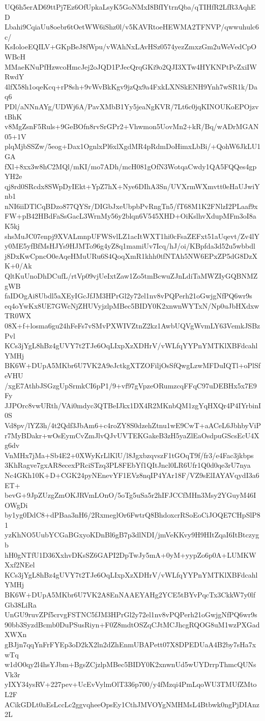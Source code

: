 UQ6h5erAD69ttPj7Ez6OfUpkaLsyK5GoNMxI8BfIYtrnQba/qTIHfR2LfR3AqhED
Lbahi9CqiaUu8oebr6tOetWW6iShz0l/v5KAVRtoeHEWMA2TFNVP/qwwuhulc6c/
KsIoloeEQILV+GKpBeJ8fWpu/vWAhNxLAvHSz0574yezZmxzGm2uWeVedCpOWBcH
MMaeKNuPfHzwcoHmcJej2oJQD1PJecQrqGKi9o2QJI3XTw4HYKNPtPeZxiIWRwdY
4lfX58h1oqeKcq+rP8sh+9vWvBkKgv9jzQx9a4FxkLXNSkENH9Ynh7wSR1k/Daq6
PDl/aNNnAYg/UDWj6A/PavXMbB1Yy5jeaNgKVR/7Lt6c0jqKINOUKoEPOjzvtBhK
v8MgZsnF5Ruls+9GeBOfn8rvSrGPr2+Vhwmon5UovMn2+kR/Bq/wADrMGAN05+1V
plqMjbSSZw/5eog+Dax1OgnlxPl6xlXgdMR4pRdmDoHimxLbBi/+QohW6JkLU1GA
fXl+8xx3w8hC2MQl/mKI/mo7ADh/mcH081gOfN3WotqaCwdy1QA5FQQes4gpYH2e
qj8rd0SRcdx8SWpDyIEkt+YpZ7hX+Nye6DIhA3Sn/UVXrmWXmvtt0eHaUJwiYnb1
nNI6iiDTlCqBDzo877QYSr/DIGbJxeUbpbPvRngTn5/fT68M1K2FNlzI2PLaaf9x
FW+pB42HBdFaSsGacL3WrnMy56y2blqn6V545XHD+OiKslhvXdupMFm3oI8aK5kj
shsMuJC07enpj9XVALmnpUFWSvlLZ1acItWXT1hi0cFsaZEFxt51aUqevt/Zv4lY
y0ME5yfBfMsHJYs9HJMTo96g4yZ8q1mamiUv7Icq/hJ/oi/KBpfda3d52u5wbbdl
j8DxKwCpncO0eAqeHMuURu6S4QoqXmR1khh0tfNTAh5NW6EPxZP5dG8DzXK+0/Ak
QltKuUnoDhDCufL/rtVp09vjUeIxtZaw1Zo5tmBcwuZJnLdiTaMWZIyGQBNMZgWB
faIDOgAi8Ubdl5aXEyIGcJfJM3HPrGl2y72el1nv8vPQPerh21oGwjgNfPQ6wr9s
eq4oYwKx8UE7GWcNjZHUVyjzlpMBec5BIDY0K2xnwnWYTxN/Np0uJbHXdxwTR0WX
08X+f+losma6gu24hFeFs7vSMvPXWIVZtnZ2kz1AwbUQVgWvmLY63VemkJSBzPvl
KCs3jYgL8hBz4gUVY7t2TJe6OqLIxpXzXDHrV/vWLfqYYPnYMTKlXBFdcahlYMHj
BK6W+DUpA5MKbr6U7VK2A9eJctkgXTZOFiljOsSfQwgLzwMFDuIQTl+oPlSfeVHU
/xgE7AthbJSGzgUpSrmkCI6pP1/9+vf97gVpzeORumzcqFFqC97uDEBHx5x7E9Fy
JJPOrc8vwURth/VAi0mdyc3QTBeIJkx1DX4R2MKnbQM1zgYqHXQr4P4IYrbinI0S
Vd8pv/lYZ3h/4t2Qdf3JbAm6+c4roZY8S0dzehZtnu1wE9CwT+aACeL6JbhbyViP
r7MyBDakr+wOsEymCvZmJlvQJvUVTEKGakeB3zH5yaZlEaOsdpuGScsEcU4Xg6dv
VnMHx7jMa+Sb4E2+0XWyKrLlKlU/l8JgxbzqvszF1tGOqT9f/fr3/e4Fac3jkbps
3KhRagve7gxAR8ecexPRciSTzq3PL8FEbYf1QItJncl0LR6Ufr1Q0d0qe3rU7nya
Nc4GKh10K+D+CGK24pyNEnevYF1EVz8nqIP4YAr18F/VZ9sElIAYAVqydI3a6ET+
bevG+9JpZUzgZmOKJRVmLOnO/5oTg5uSa5r2hIFJCCfMHn3Msy2YGuyM46IOWgDi
by1yg0DdC8+dPBaa3nH6/2RxmeglOr6FwtrQ8BhdoxcrRSoEoCiJOQE7CHpSlP81
yzKhNO5UubYCGaBGxyoKDnBl6gB7p3dlNDI/jmVeKKvy9H9HItZqaI6ItBtczygb
hH0gNTfU1D36XxhvDKsSZ6GAPI2DpTwJy5mA+0yM+yypZo6p0A+LUMKWXxf2NEel
KCs3jYgL8hBz4gUVY7t2TJe6OqLIxpXzXDHrV/vWLfqYYPnYMTKlXBFdcahlYMHj
BK6W+DUpA5MKbr6U7VK2A8EnNAAEYAHg2YCE5tBYvPqcTx3CkkW7y0lfGb38LiRa
UnGU9ruvZPf5crvgFSTNC5fJM3HPrGl2y72el1nv8vPQPerh21oGwjgNfPQ6wr9s
90bb3SyzdBcmb0DuPSusRiyn+F0Z8mdtOSZqCJtMCJhcgRQOG8uM1wzPXGadXWXn
gBJjn7qqYnFrFYEp3oD2kX2ln2dZhEnmUBAPett07X8DPEDUaA4B2by7sHa7xwTq
w1dO0qy2l4hsYJbm+BgsZCjzlpMBec5BIDY0K2xnwnUd5wUYDrrpThmcQUNsVk3r
yIXY34ysRV+227pev+UcEvVylmOlT336p700/y4fMzqi4PmLqoWU3TMUfZMtoL2F
ACikGDLt0aEsLccLc2ggvqheeOpsEy1CthJMVOYgNMHMsL4Btbwk0ngPjDIAnz2L
